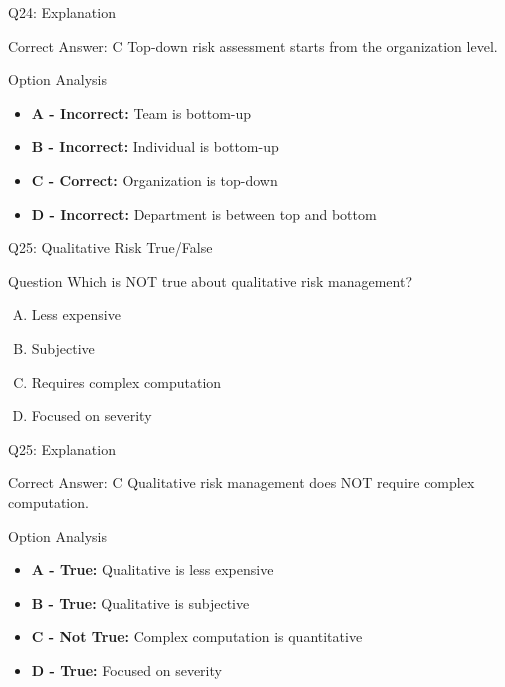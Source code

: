 \documentclass{beamer}
\begin{document}
	\begin{frame}{Q24: Explanation}
		\begin{block}{Correct Answer: C}
			Top-down risk assessment starts from the organization level.
		\end{block}
		\begin{block}{Option Analysis}
			\begin{itemize}
				\item \textbf{A - Incorrect:} Team is bottom-up
				\item \textbf{B - Incorrect:} Individual is bottom-up
				\item \textbf{C - Correct:} Organization is top-down
				\item \textbf{D - Incorrect:} Department is between top and bottom
			\end{itemize}
		\end{block}
	\end{frame}
	
	\begin{frame}{Q25: Qualitative Risk True/False}
		\begin{block}{Question}
			Which is NOT true about qualitative risk management?
		\end{block}
		\begin{enumerate}[(A)]
			\item Less expensive
			\item Subjective
			\item Requires complex computation
			\item Focused on severity
		\end{enumerate}
	\end{frame}
	
	\begin{frame}{Q25: Explanation}
		\begin{block}{Correct Answer: C}
			Qualitative risk management does NOT require complex computation.
		\end{block}
		\begin{block}{Option Analysis}
			\begin{itemize}
				\item \textbf{A - True:} Qualitative is less expensive
				\item \textbf{B - True:} Qualitative is subjective
				\item \textbf{C - Not True:} Complex computation is quantitative
				\item \textbf{D - True:} Focused on severity
			\end{itemize}
		\end{block}
	\end{frame}
	
\end{document}
